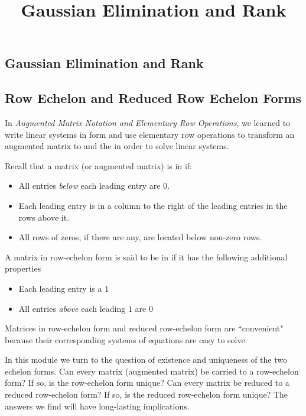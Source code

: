 \documentclass{ximera}
\title{Gaussian Elimination and Rank} \license{CC BY-NC-SA 4.0}
\begin{document}
\begin{abstract}
 
\end{abstract}
\maketitle

\begin{onlineOnly}
\section*{Gaussian Elimination and Rank}
\end{onlineOnly}

\subsection*{Row Echelon and Reduced Row Echelon Forms}

In \textit{Augmented Matrix Notation and Elementary Row Operations}, we learned to write linear systems in  form and use elementary row operations to transform an augmented matrix to  and the  in order to solve linear systems.  

Recall that a matrix (or augmented matrix) is in  if:
\begin{itemize}
\item All entries {\it below} each leading entry are $0$.
\item Each leading entry is in a column to the right of the leading entries in the rows above it.
\item All rows of zeros, if there are any, are located below non-zero rows.
\end{itemize}

A matrix in row-echelon form is said to be in  if it has the following additional properties
\begin{itemize}
\item Each leading entry is a $1$
\item All entries {\it above} each leading $1$ are $0$
\end{itemize}


Matrices in row-echelon form and reduced row-echelon form are ``convenient" because their corresponding systems of equations are easy to solve.  

In this module we turn to the question of existence and uniqueness of the two echelon forms.  Can every matrix (augmented matrix) be carried to a row-echelon form?  If so, is the row-echelon form unique?  Can every matrix be reduced to a reduced row-echelon form?  If so, is the reduced row-echelon form unique?  The answers we find will have long-lasting implications.
\end{document}
